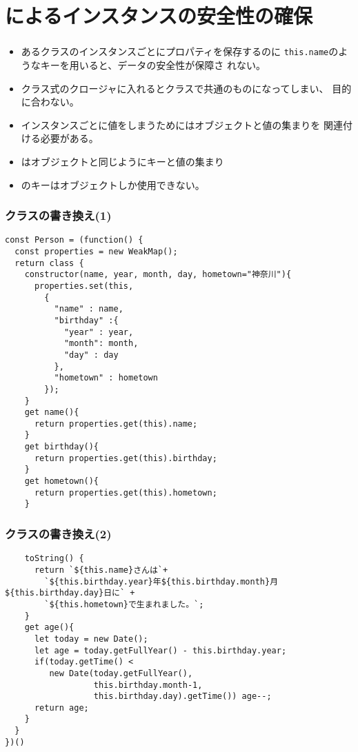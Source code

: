 \section{\protect{}によるインスタンスの安全性の確保}
\begin{frame}[containsverbatim]
 \frametitle{\protect{}}
 \begin{itemize}
  \item あるクラスのインスタンスごとにプロパティを保存するのに
        \texttt{this.name}のようなキーを用いると、データの安全性が保障さ
        れない。
  \item クラス式のクロージャに入れるとクラスで共通のものになってしまい、
        目的に合わない。
  \item インスタンスごとに値をしまうためにはオブジェクトと値の集まりを
        関連付ける必要がある。
  \item {}はオブジェクトと同じようにキーと値の集まり
  \item {}のキーはオブジェクトしか使用できない。
 \end{itemize}
\end{frame}
\begin{frame}[containsverbatim]
 \frametitle{\protect{}クラスの書き換え(1)}
 {\scriptsize
\begin{Verbatim}
const Person = (function() {
  const properties = new WeakMap();
  return class {
    constructor(name, year, month, day, hometown="神奈川"){
      properties.set(this,
        {
          "name" : name,
          "birthday" :{
            "year" : year,
            "month": month,
            "day" : day
          },
          "hometown" : hometown
        });
    }
    get name(){
      return properties.get(this).name;
    }
    get birthday(){
      return properties.get(this).birthday;
    }
    get hometown(){
      return properties.get(this).hometown;
    }
\end{Verbatim}
 }
 \end{frame}
\begin{frame}[containsverbatim]
 \frametitle{\protect{}クラスの書き換え(2)}
 {\scriptsize
\begin{Verbatim}
    toString() {
      return `${this.name}さんは`+
        `${this.birthday.year}年${this.birthday.month}月${this.birthday.day}日に` +
        `${this.hometown}で生まれました。`;
    }
    get age(){
      let today = new Date();
      let age = today.getFullYear() - this.birthday.year;
      if(today.getTime() <
         new Date(today.getFullYear(),
                  this.birthday.month-1,
                  this.birthday.day).getTime()) age--;
      return age;
    }
  }
})()
\end{Verbatim}
 }
\end{frame}
